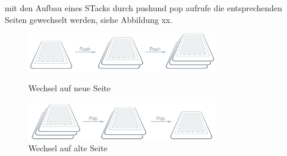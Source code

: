  mit den Aufbau eines STacks durch pushund pop aufrufe die entsprechenden Seiten gewechselt werden, siehe Abbildung xx. 

\begin{figure}[h]
	\begin{center}
		\includegraphics[width=0.75\textwidth]{images/implementation/push.png}
	\end{center}	
	\caption{Wechsel auf neue Seite}
	\label{fig:push}
	\begin{center}
		\includegraphics[width=0.75\textwidth]{images/implementation/pop.png}
	\end{center}	
	\caption{Wechsel auf alte Seite}
	\label{fig:pop}
\end{figure}

